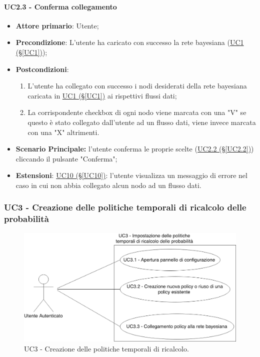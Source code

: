 \paragraph{UC2.3 - Conferma collegamento}\label{UC2.3}
\begin{itemize}
\item \textbf{Attore primario}: Utente;
\item \textbf{Precondizione}: L'utente ha caricato con successo la rete bayesiana (\hyperref[UC1]{UC1 (§\ref*{UC1})});
\item \textbf{Postcondizioni}: 
	\begin{enumerate}
	\item L'utente ha collegato con successo i nodi desiderati della rete bayesiana caricata in \hyperref[UC1]{UC1 				(§\ref*{UC1})} ai rispettivi flussi dati;
	\item La corrispondente checkbox di ogni nodo viene marcata con una "V" se questo è stato collegato dall'utente 				ad un flusso dati, viene invece marcata con una "X" altrimenti.
	\end{enumerate}
\item \textbf{Scenario Principale:} l'utente conferma le proprie scelte (\hyperref[UC2.2]{UC2.2 (§\ref*{UC2.2})}) cliccando il pulsante "Conferma";
\item \textbf{Estensioni}: \hyperref[UC10]{UC10 (§\ref*{UC10})}: l'utente visualizza un messaggio di errore nel caso in cui non abbia collegato alcun nodo ad un flusso dati.
\end{itemize}
\newpage

\subsubsection{UC3 - Creazione delle politiche temporali di ricalcolo delle probabilità}\label{UC3}

\begin{figure}[H]
\centering
\includegraphics[scale=0.3]{./images/UC3.png}
\caption{UC3 - Creazione delle politiche temporali di ricalcolo.}
\end{figure}

